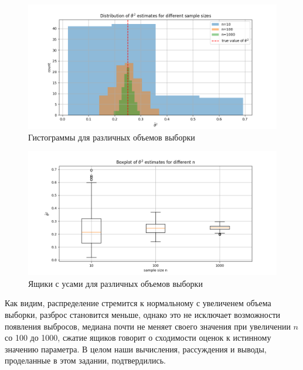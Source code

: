 \documentclass[a4paper, 12pt]{article}
\begin{document}
    \begin{figure}[H]
        \centering
        \includegraphics[scale=0.55]{hist_10_100_1000.png}
        \captionsetup{skip=0pt}
        \caption{Гистограммы для различных объемов выборки}
        \label{fig:hist}
    \end{figure}
    \begin{figure}[H]
        \centering
        \includegraphics[scale=0.55]{boxplot_10_100_1000.png}
        \captionsetup{skip=0pt}
        \caption{Ящики с усами для различных объемов выборки}
        \label{fig:boxplot}
    \end{figure}
    

    Как видим, распределение стремится к нормальному с увеличенем объема выборки, разброс становится меньше, однако это не исключает
    возможности появления выбросов, медиана почти не меняет своего значения при увеличении $n$ со 100 до 1000, сжатие ящиков говорит
    о сходимости оценок к истинному значению параметра. В целом наши вычисления, рассуждения и выводы, проделанные в этом задании,
    подтвердились.
\end{document}

